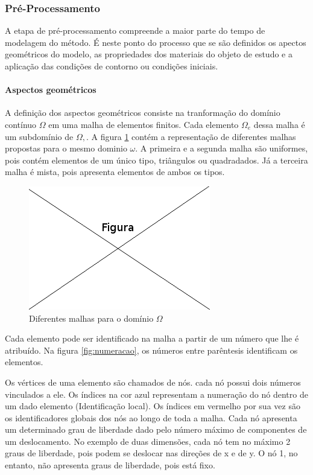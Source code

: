 \subsubsection{Pré-Processamento}
A etapa de pré-processamento compreende a maior parte do tempo de modelagem do método. É neste ponto do processo que se são definidos os apectos geométricos do modelo, as propriedades dos materiais do objeto de estudo e a aplicação das condições de contorno ou condições iniciais.

\paragraph{Aspectos geométricos \\} 
A definição dos aspectos geométricos consiste na tranformação do domínio contínuo $\Omega$ em uma malha de elementos finitos. Cada elemento $\Omega_e$ dessa malha é um subdomínio de $\Omega,$. A figura \ref{fig:malhas} contém a representação de diferentes malhas propostas para o mesmo dominio $\omega$. A primeira e a segunda malha são uniformes, pois contém elementos de um único tipo, triângulos ou quadradados. Já a terceira malha é mista, pois apresenta elementos de ambos os tipos. 

\begin{figure}[!htb]
\centering
\includegraphics[scale=0.5]{figuras/temp.png}
\caption{Diferentes malhas para o domínio $\Omega$}
\label{fig:malhas}
\end{figure}

Cada elemento pode ser identificado na malha a partir de um número que lhe é atribuído. Na figura \ref{fig:numeracao}, os números entre parêntesis identificam os elementos.

Os vértices de uma elemento são chamados de nós. cada nó possui dois números vinculados a ele. Os índices na cor azul representam a numeração do nó dentro de um dado elemento (Identificação local). Os índices em vermelho por sua vez são os identificadores globais dos nós ao longo de toda a malha. Cada nó apresenta um determinado grau de liberdade dado pelo número máximo de componentes de um deslocamento. No exemplo de duas dimensões, cada nó tem no máximo 2 graus de liberdade, pois podem se deslocar nas direções de x e de y. O nó 1, no entanto, não apresenta graus de liberdade, pois está fixo. 

